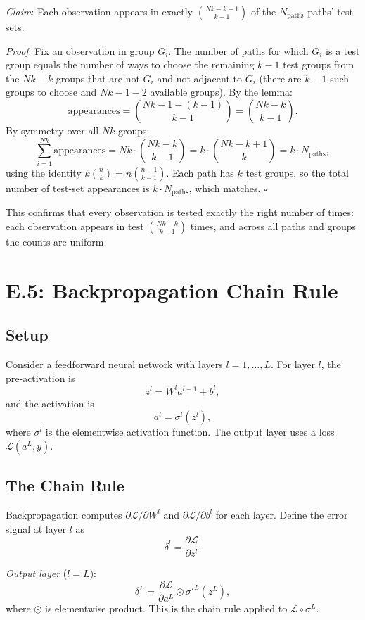 \emph{Claim}: Each observation appears in exactly $\binom{Nk - k -
1}{k - 1}$ of the $N_{\text{paths}}$ paths' test sets.

\emph{Proof}: Fix an observation in group $G_i$. The number of paths
for which $G_i$ is a test group equals the number of ways to choose
the remaining $k - 1$ test groups from the $Nk - k$ groups that are
not $G_i$ and not adjacent to $G_i$ (there are $k - 1$ such groups to
choose and $Nk - 1 - 2$ available groups). By the lemma:
\[
\text{appearances} = \binom{Nk - 1 - (k - 1)}{k - 1} = \binom{Nk - k}{k - 1}.
\]
By symmetry over all $Nk$ groups:
\[
\sum_{i=1}^{Nk} \text{appearances} = Nk \cdot \binom{Nk - k}{k - 1} = k \cdot \binom{Nk - k + 1}{k} = k \cdot N_{\text{paths}},
\]
using the identity $k \binom{n}{k} = n \binom{n-1}{k-1}$. Each path has
$k$ test groups, so the total number of test-set appearances is $k
\cdot N_{\text{paths}}$, which matches. $\square$

This confirms that every observation is tested exactly the right
number of times: each observation appears in test
$\binom{Nk - k}{k - 1}$ times, and across all paths and groups the
counts are uniform.

\section{E.5: Backpropagation Chain Rule}

\subsection{Setup}

Consider a feedforward neural network with layers $l = 1, \dots, L$.
For layer $l$, the pre-activation is
\[
z^l = W^l a^{l-1} + b^l,
\]
and the activation is
\[
a^l = \sigma^l(z^l),
\]
where $\sigma^l$ is the elementwise activation function. The output
layer uses a loss $\mathcal{L}(a^L, y)$.

\subsection{The Chain Rule}

Backpropagation computes $\partial \mathcal{L} / \partial W^l$ and
$\partial \mathcal{L} / \partial b^l$ for each layer. Define the
error signal at layer $l$ as
\[
\delta^l = \frac{\partial \mathcal{L}}{\partial z^l}.
\]

\emph{Output layer} ($l = L$):
\[
\delta^L = \frac{\partial \mathcal{L}}{\partial a^L} \odot \sigma'^L(z^L),
\]
where $\odot$ is elementwise product. This is the chain rule applied
to $\mathcal{L} \circ \sigma^L$.

